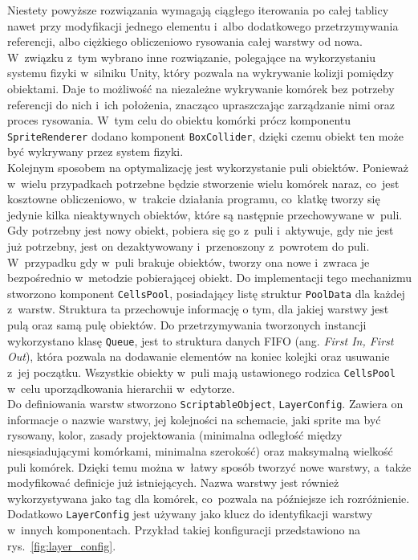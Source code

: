 Niestety powyższe rozwiązania wymagają ciągłego iterowania po całej tablicy nawet przy modyfikacji jednego elementu
i~albo dodatkowego przetrzymywania referencji, albo ciężkiego obliczeniowo rysowania całej warstwy od nowa.
W~związku z~tym wybrano inne rozwiązanie, polegające na wykorzystaniu systemu fizyki w~silniku Unity,
który pozwala na wykrywanie kolizji pomiędzy obiektami.
Daje to możliwość na niezależne wykrywanie komórek bez potrzeby referencji do nich i~ich położenia,
znacząco upraszczając zarządzanie nimi oraz proces rysowania.
W~tym celu do obiektu komórki prócz komponentu \texttt{SpriteRenderer} dodano komponent \texttt{BoxCollider},
dzięki czemu obiekt ten może być wykrywany przez system fizyki.\\
\indent Kolejnym sposobem na optymalizację jest wykorzystanie puli obiektów.
Ponieważ w~wielu przypadkach potrzebne będzie stworzenie wielu komórek naraz, co~jest kosztowne obliczeniowo,
w~trakcie działania programu, co~klatkę tworzy się jedynie kilka nieaktywnych obiektów,
które są następnie przechowywane w~puli.
Gdy potrzebny jest nowy obiekt, pobiera się go z~puli i~aktywuje, gdy nie jest już potrzebny,
jest on dezaktywowany i~przenoszony z~powrotem do puli.
W~przypadku gdy w~puli brakuje obiektów, tworzy ona nowe i~zwraca je bezpośrednio w~metodzie pobierającej obiekt.
Do implementacji tego mechanizmu stworzono komponent \texttt{CellsPool},
posiadający listę struktur \texttt{PoolData} dla każdej z~warstw.
Struktura ta przechowuje informację o tym, dla jakiej warstwy jest pulą oraz samą pulę obiektów.
Do przetrzymywania tworzonych instancji wykorzystano klasę \texttt{Queue},
jest to struktura danych FIFO (ang. \textit{First In, First Out}),
która pozwala na dodawanie elementów na koniec kolejki oraz usuwanie z~jej początku.
Wszystkie obiekty w~puli mają ustawionego rodzica \texttt{CellsPool} w~celu uporządkowania hierarchii w~edytorze.\\
\indent Do definiowania warstw stworzono \texttt{ScriptableObject}, \texttt{LayerConfig}.
Zawiera on informacje o nazwie warstwy, jej kolejności na schemacie, jaki sprite ma być rysowany, kolor,
zasady projektowania (minimalna odległość między niesąsiadującymi komórkami, minimalna szerokość)
oraz maksymalną wielkość puli komórek.
Dzięki temu można w~łatwy sposób tworzyć nowe warstwy, a~także modyfikować definicje już istniejących.
Nazwa warstwy jest również wykorzystywana jako tag dla komórek, co~pozwala na późniejsze ich rozróżnienie.
Dodatkowo \texttt{LayerConfig} jest używany jako klucz do identyfikacji warstwy w~innych komponentach.
Przykład takiej konfiguracji przedstawiono na rys.~\ref{fig:layer_config}.

